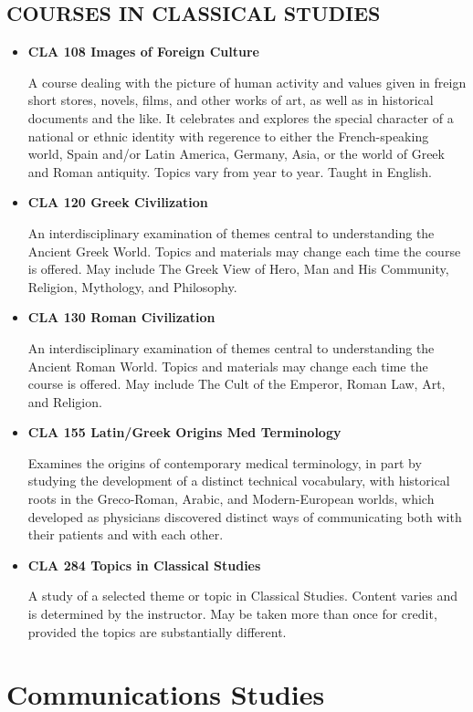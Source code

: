 \documentclass[
  letterpaper,
]{scrbook}
\begin{document}
\subsection{COURSES IN CLASSICAL
STUDIES}\label{courses-in-classical-studies}

\begin{itemize}
\item
  \textbf{CLA 108 Images of Foreign Culture}

  A course dealing with the picture of human activity and values given
  in freign short stores, novels, films, and other works of art, as well
  as in historical documents and the like. It celebrates and explores
  the special character of a national or ethnic identity with regerence
  to either the French-speaking world, Spain and/or Latin America,
  Germany, Asia, or the world of Greek and Roman antiquity. Topics vary
  from year to year. Taught in English.
\item
  \textbf{CLA 120 Greek Civilization}

  An interdisciplinary examination of themes central to understanding
  the Ancient Greek World. Topics and materials may change each time the
  course is offered. May include The Greek View of Hero, Man and His
  Community, Religion, Mythology, and Philosophy.
\item
  \textbf{CLA 130 Roman Civilization}

  An interdisciplinary examination of themes central to understanding
  the Ancient Roman World. Topics and materials may change each time the
  course is offered. May include The Cult of the Emperor, Roman Law,
  Art, and Religion.
\item
  \textbf{CLA 155 Latin/Greek Origins Med Terminology}

  Examines the origins of contemporary medical terminology, in part by
  studying the development of a distinct technical vocabulary, with
  historical roots in the Greco-Roman, Arabic, and Modern-European
  worlds, which developed as physicians discovered distinct ways of
  communicating both with their patients and with each other.
\item
  \textbf{CLA 284 Topics in Classical Studies}

  A study of a selected theme or topic in Classical Studies. Content
  varies and is determined by the instructor. May be taken more than
  once for credit, provided the topics are substantially different.
\end{itemize}

\section{Communications Studies}\label{sec-communication-studies}
\end{document}

